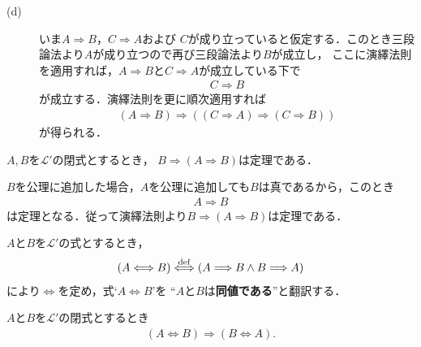 \begin{prf}
\begin{description}
			\item[(d)]
				いま$A \Longrightarrow B$，$C \Longrightarrow A$および
				$C$が成り立っていると仮定する．このとき三段論法より$A$が成り立つので再び三段論法より$B$が成立し，
				ここに演繹法則を適用すれば，$A \Longrightarrow B$と$C \Longrightarrow A$が成立している下で
				\begin{align}
					C \Longrightarrow B
				\end{align}
				が成立する．演繹法則を更に順次適用すれば
				\begin{align}
					(A \Longrightarrow B) \Longrightarrow ( (C \Longrightarrow A) \Longrightarrow (C \Longrightarrow B) )
				\end{align}
				が得られる．
				\QED
		\end{description}
	\end{prf}
	
	\begin{screen}
		\begin{logicalthm}[正しい式は仮定を選ばない]\label{logicalthm:rule_of_inference_2}
			$A,B$を$\mathcal{L}'$の閉式とするとき，
			$B \Longrightarrow (A \Longrightarrow B)$は定理である．
		\end{logicalthm}
	\end{screen}
	
	\begin{prf}
		$B$を公理に追加した場合，$A$を公理に追加しても$B$は真であるから，このとき
		\begin{align}
			A \Longrightarrow B
		\end{align}
		は定理となる．従って演繹法則より$B \Longrightarrow (A \Longrightarrow B)$は定理である．
		\QED
	\end{prf}
	
	$A$と$B$を$\mathcal{L}'$の式とするとき，
	\begin{align}
		(A \Longleftrightarrow B) \overset{\mathrm{def}}{\Longleftrightarrow}
		(A \Longrightarrow B \wedge B \Longrightarrow A)
	\end{align}
	により$\Longleftrightarrow$を定め，式`$A \Longleftrightarrow B$'を
	``$A$と$B$は{\bf 同値である}''と翻訳する．
	
	\begin{screen}
		\begin{logicalthm}[同値記号の可換律]\label{logicalthm:commutative_law_of_equivalence}
			$A$と$B$を$\mathcal{L}'$の閉式とするとき
			\begin{align}
				(A \Longleftrightarrow B) \Longrightarrow (B \Longleftrightarrow A).
			\end{align}
		\end{logicalthm}
	\end{screen}
	
